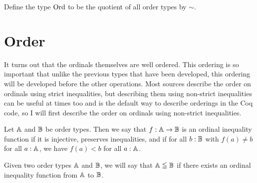 \documentclass[../../math.tex]{subfiles}
\begin{document}
\begin{definition}
    Define the type $\operatorname{Ord}$ to be the quotient of all order types by $\sim$.
\end{definition}

\section{Order}

It turns out that the ordinals themselves are well ordered.  This ordering is so
important that unlike the previous types that have been developed, this ordering
will be developed before the other operations.  Most sources describe the order
on ordinals using strict inequalities, but describing them using non-strict
inequalities can be useful at times too and is the default way to describe
orderings in the Coq code, so I will first describe the order on ordinals using
non-strict inequalities.

\begin{definition}
    Let $\mathbb{A}$ and $\mathbb{B}$ be order types.  Then we say that $f : \mathbb{A} \to \mathbb{B}$ is an
    ordinal inequality function if it is injective, preserves inequalities, and
    if for all $b : \mathbb{B}$ with $f(a) \neq b$ for all $a : \mathbb{A}$, we have $f(a) < b$
    for all $a : \mathbb{A}$.
\end{definition}

\begin{definition}
    Given two order types $\mathbb{A}$ and $\mathbb{B}$, we will say that $\mathbb{A} \leqq \mathbb{B}$ if there
    exists an ordinal inequality function from $\mathbb{A}$ to $\mathbb{B}$.
\end{definition}
\end{document}
